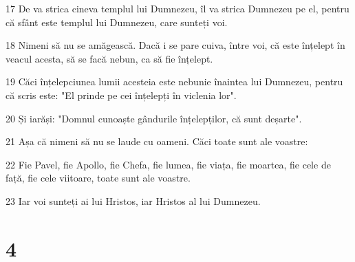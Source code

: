 \par 17 De va strica cineva templul lui Dumnezeu, îl va strica Dumnezeu pe el, pentru că sfânt este templul lui Dumnezeu, care sunteți voi.
\par 18 Nimeni să nu se amăgească. Dacă i se pare cuiva, între voi, că este înțelept în veacul acesta, să se facă nebun, ca să fie înțelept.
\par 19 Căci înțelepciunea lumii acesteia este nebunie înaintea lui Dumnezeu, pentru că scris este: "El prinde pe cei înțelepți în viclenia lor".
\par 20 Și iarăși: "Domnul cunoaște gândurile înțelepților, că sunt deșarte".
\par 21 Așa că nimeni să nu se laude cu oameni. Căci toate sunt ale voastre:
\par 22 Fie Pavel, fie Apollo, fie Chefa, fie lumea, fie viața, fie moartea, fie cele de față, fie cele viitoare, toate sunt ale voastre.
\par 23 Iar voi sunteți ai lui Hristos, iar Hristos al lui Dumnezeu.

\chapter{4}

